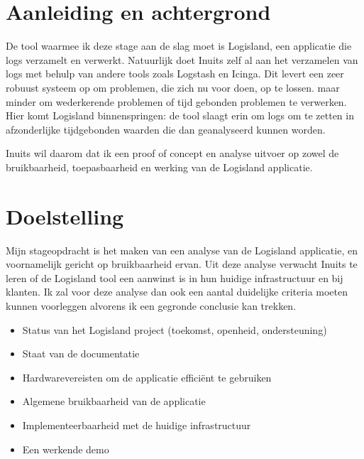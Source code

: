 \documentclass[a4paper]{article}
\begin{document}
\newpage{}
\section{Aanleiding en achtergrond}
De tool waarmee ik deze stage aan de slag moet is Logisland, een applicatie die logs verzamelt en verwerkt.
Natuurlijk doet Inuits zelf al aan het verzamelen van logs met behulp van andere tools zoals Logstash en Icinga.
Dit levert een zeer robuust systeem op om problemen, die zich nu voor doen, op te lossen. maar minder om wederkerende problemen of tijd gebonden problemen te verwerken.
Hier komt Logisland binnenspringen: de tool slaagt erin om logs om te zetten in afzonderlijke tijdgebonden waarden die dan geanalyseerd kunnen worden.
\par
Inuits wil daarom dat ik een proof of concept en analyse uitvoer op zowel de bruikbaarheid, toepasbaarheid en werking van de Logisland applicatie. 

\newpage{}
\section{Doelstelling}
Mijn stageopdracht is het maken van een analyse van de Logisland applicatie, en voornamelijk gericht op bruikbaarheid ervan. 
Uit deze analyse verwacht Inuits te leren of de Logisland tool een aanwinst is in hun huidige infrastructuur en bij klanten.
Ik zal voor deze analyse dan ook een aantal duidelijke criteria moeten kunnen voorleggen alvorens ik een gegronde conclusie kan trekken.
\par
\begin{itemize}
\item Status van het Logisland project (toekomst, openheid, ondersteuning)
\item Staat van de documentatie 
\item Hardwarevereisten om de applicatie efficiënt te gebruiken
\item Algemene bruikbaarheid van de applicatie
\item Implementeerbaarheid met de huidige infrastructuur
\item Een werkende demo

\end{itemize}

\newpage{}
\end{document}
